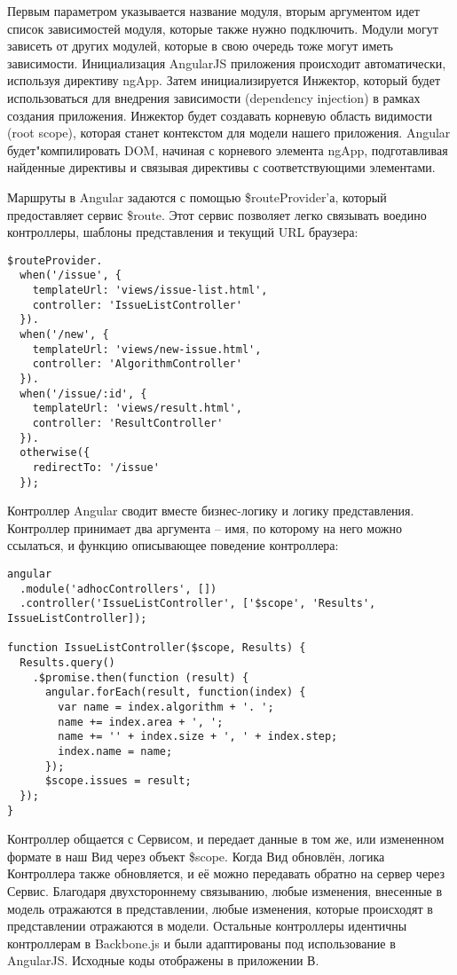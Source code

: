 Первым параметром указывается название модуля, вторым аргументом идет список зависимостей модуля, которые также нужно подключить. Модули могут зависеть от других модулей, которые в свою очередь тоже могут иметь зависимости.
Инициализация AngularJS приложения происходит автоматически, используя директиву ngApp. Затем инициализируется Инжектор, который будет использоваться для внедрения зависимости (dependency injection) в рамках создания приложения. Инжектор будет создавать корневую область видимости (root scope), которая станет контекстом для модели нашего приложения. Angular будет"компилировать DOM, начиная с корневого элемента ngApp, подготавливая найденные директивы и связывая директивы с соответствующими элементами\cite{angular:tutorial}.

Маршруты в Angular задаются с помощью \$routeProvider'а, который предоставляет сервис \$route. Этот сервис позволяет легко связывать воедино контроллеры, шаблоны представления и текущий URL браузера:
\begin{lstlisting}
$routeProvider.
  when('/issue', {
    templateUrl: 'views/issue-list.html',
    controller: 'IssueListController'
  }).
  when('/new', {
    templateUrl: 'views/new-issue.html',
    controller: 'AlgorithmController'
  }).
  when('/issue/:id', {
    templateUrl: 'views/result.html',
    controller: 'ResultController'
  }).
  otherwise({
    redirectTo: '/issue'
  });
\end{lstlisting}

Контроллер Angular сводит вместе бизнес-логику и логику представления. Контроллер принимает два аргумента – имя, по которому на него можно ссылаться, и функцию описывающее поведение контроллера:
\begin{lstlisting}
angular
  .module('adhocControllers', [])
  .controller('IssueListController', ['$scope', 'Results', IssueListController]);

function IssueListController($scope, Results) {
  Results.query()
    .$promise.then(function (result) {
      angular.forEach(result, function(index) {
        var name = index.algorithm + '. ';
        name += index.area + ', ';
        name += '' + index.size + ', ' + index.step;
        index.name = name;
      });
      $scope.issues = result;
  });
}
\end{lstlisting}

Контроллер общается с Сервисом, и передает данные в том же, или измененном формате в наш Вид через объект \$scope. Когда Вид обновлён, логика Контроллера также обновляется, и её можно передавать обратно на сервер через Сервис. Благодаря двухстороннему связыванию, любые изменения, внесенные в модель отражаются в представлении, любые изменения, которые происходят в представлении отражаются в модели. Остальные контроллеры идентичны контроллерам в Backbone.js и были адаптированы под использование в AngularJS. Исходные коды отображены в приложении В.


